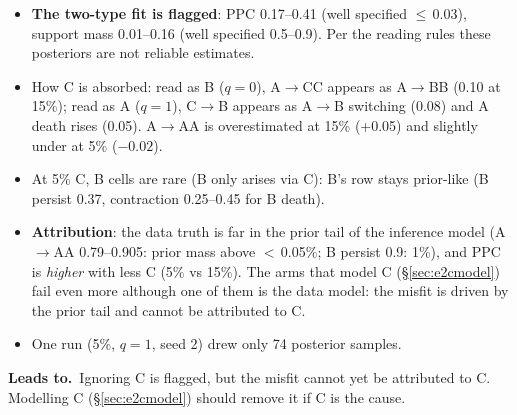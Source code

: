 \documentclass[10pt,a4paper]{article}
\newcommand{\blk}[1]{\par\needspace{5\baselineskip}\smallskip{\sffamily\bfseries\color{inkgray}#1}\par}
\newcommand{\Comment}{\blk{Comment}}
\newcommand{\Leads}[1]{\begin{leadbox}{\sffamily\bfseries\color{caqua!70!black}Leads to.}\ #1\end{leadbox}}
\renewcommand{\blk}[1]{\par\Needspace*{5\baselineskip}\smallskip{\sffamily\bfseries\color{inkgray}#1}\par}
\newcommand{\sref}[1]{\S\ref{#1}}
\begin{document}
\Comment
\begin{itemize}
\item \textbf{The two-type fit is flagged}: PPC 0.17--0.41 (well specified $\le$\,0.03), support mass 0.01--0.16 (well specified 0.5--0.9). Per the reading rules these posteriors are not reliable estimates.
\item How C is absorbed: read as B ($q=0$), A$\to$CC appears as A$\to$BB (0.10 at 15\%); read as A ($q=1$), C$\to$B appears as A$\to$B switching (0.08) and A death rises (0.05). A$\to$AA is overestimated at 15\% (+0.05) and slightly under at 5\% ($-0.02$).
\item At 5\% C, B cells are rare (B only arises via C): B's row stays prior-like (B persist 0.37, contraction 0.25--0.45 for B death).
\item \textbf{Attribution}: the data truth is far in the prior tail of the inference model (A$\to$AA 0.79--0.905: prior mass above $<$\,0.05\%; B persist 0.9: 1\%), and PPC is \emph{higher} with less C (5\% vs 15\%). The arms that model C (\S\ref{sec:e2cmodel}) fail even more although one of them is the data model: the misfit is driven by the prior tail and cannot be attributed to C.
\item One run (5\%, $q=1$, seed 2) drew only 74 posterior samples.
\end{itemize}
\Leads{Ignoring C is flagged, but the misfit cannot yet be attributed to C. Modelling C (\sref{sec:e2cmodel}) should remove it if C is the cause.}
\end{document}
